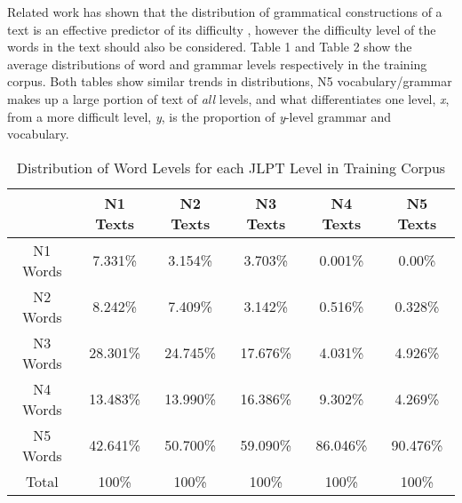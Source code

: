\documentclass[12pt, a4paper]{article}
\begin{document}
Related work has shown that the distribution of grammatical constructions of a text is an effective 
predictor of its difficulty \citep{grammarTemplate, chineseSpeaker}, however the difficulty level of the words in the text should 
also be considered. Table 1 and Table 2 show the average distributions of word and grammar levels respectively in the training corpus.
Both tables show similar trends in distributions, N5 vocabulary/grammar makes up a large portion of text of \textit{all} levels,
and what differentiates one level, \textit{x}, from a more difficult level, \textit{y}, is the proportion of \textit{y}-level 
grammar and vocabulary.

\begin{table}[h!]
    \begin{center}
        \begin{tabular}{|c|c|c|c|c|c|}
            \hline
                     & N1 Texts & N2 Texts & N3 Texts & N4 Texts & N5 Texts \\ \hline
            N1 Words & 7.331\%         & 3.154\%         & 3.703\%         & 0.001\%         &  0.00\%        \\ \hline
            N2 Words & 8.242\%         & 7.409\%         & 3.142\%         & 0.516\%         &  0.328\%        \\ \hline
            N3 Words & 28.301\%         & 24.745\%         & 17.676\%         & 4.031\%         & 4.926\%         \\ \hline
            N4 Words & 13.483\%         & 13.990\%         & 16.386\%          & 9.302\%         & 4.269\%        \\ \hline
            N5 Words & 42.641\%         & 50.700\%         & 59.090\%         & 86.046\%         & 90.476\%          \\ \hline
            Total    & 100\%         & 100\%         & 100\%         & 100\%         & 100\%         \\ \hline
        \end{tabular}
        \caption{Distribution of Word Levels for each JLPT Level in Training Corpus}
        \label{tab:table1}
    \end{center}
\end{table}
\end{document}
